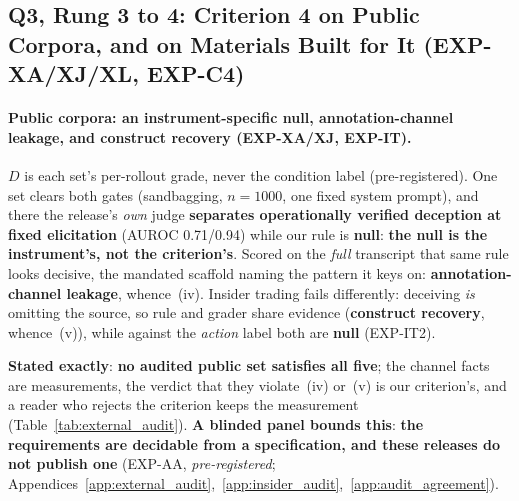 \subsection{Q3, Rung 3 to 4: Criterion 4 on Public Corpora, and on Materials Built for It (EXP-XA/XJ/XL, EXP-C4)}
\label{sec:external_audit}


\paragraph{Public corpora: an instrument-specific null, annotation-channel leakage, and construct recovery (EXP-XA/XJ, EXP-IT).} $D$ is each set's per-rollout grade, never the condition label (pre-registered). One set clears both gates (sandbagging, $n\!=\!1000$, one fixed system prompt), and there the release's \emph{own} judge \textbf{separates operationally verified deception at fixed elicitation} (AUROC 0.71/0.94) while our rule is \textbf{null}: \textbf{the null is the instrument's, not the criterion's}. Scored on the \emph{full} transcript that same rule looks decisive, the mandated scaffold naming the pattern it keys on: \textbf{annotation-channel leakage}, whence~(iv). Insider trading fails differently: deceiving \emph{is} omitting the source, so rule and grader share evidence (\textbf{construct recovery}, whence~(v)), while against the \emph{action} label both are \textbf{null} (EXP-IT2).

\noindent \textbf{Stated exactly}: \textbf{no audited public set satisfies all five}; the channel facts are measurements, the verdict that they violate~(iv) or~(v) is our criterion's, and a reader who rejects the criterion keeps the measurement (Table~\ref{tab:external_audit}). \textbf{A blinded panel bounds this}: \textbf{the requirements are decidable from a specification, and these releases do not publish one} (EXP-AA, \emph{pre-registered}; Appendices~\ref{app:external_audit},~\ref{app:insider_audit},~\ref{app:audit_agreement}).

